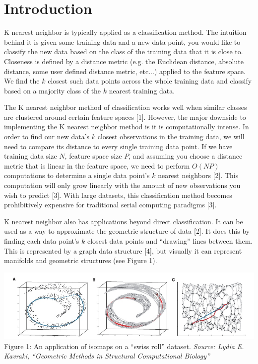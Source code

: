 \section{Introduction}

\vspace{5 mm}
\noindent
K nearest neighbor is typically applied as a classification method. The 
intuition behind it is given some training data and a new data point, you would 
like to classify the new data based on the class of the training data that it 
is close to. Closeness is defined by a distance metric (e.g. the Euclidean 
distance, absolute distance, some user defined distance metric, etc...) applied 
to the feature space. We find the $k$ closest such data points across the whole 
training data and classify based on a majority class of the $k$ nearest 
training data.

\vspace{5 mm}
\noindent
The K nearest neighbor method of classification works well when similar classes 
are clustered around certain feature spaces [1]. However, the major downside to 
implementing the K nearest neighbor method is it is computationally intense. 
In order to find our new data's $k$ closest observations in the training data, 
we will need to compare its distance to every single training data point. 
If we have training data size $N$, feature space size $P$, and assuming you 
choose a distance metric that is linear in the feature space, we need to 
perform $O(NP)$ computations to determine a single data point's $k$ nearest 
neighbors [2]. This computation will only grow linearly with the amount of new 
observations you wish to predict [3]. With large datasets, this classification 
method becomes prohibitively expensive for traditional serial computing 
paradigms [3].


\vspace{5 mm}
\noindent
K nearest neighbor also has applications beyond direct classification. It can 
be used as a way to approximate the geometric structure of data [2]. It does 
this by finding each data point's $k$ closest data points and ``drawing'' lines 
between them. This is represented by a graph data structure [4], but visually it 
can represent manifolds and geometric structures (see Figure 1).

\includegraphics{manifold}
Figure 1: An application of isomaps on a ``swiss roll'' dataset. \textit{Source: Lydia E. Kavraki, ``Geometric Methods in Structural
Computational Biology''}

